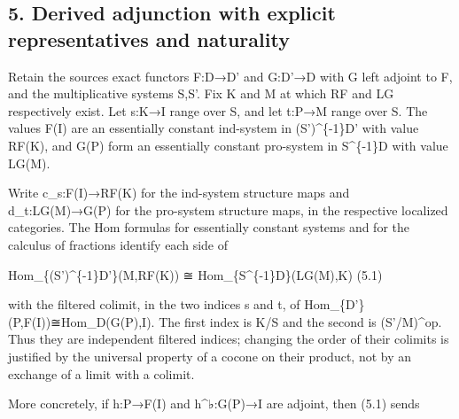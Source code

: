 \subsection{5. Derived adjunction with explicit representatives and naturality}\label{proofs-9206-9744-derived-adjunction-with-explicit-representatives-and-naturality}

Retain the source\textquotesingle s exact functors F:\allowbreak{}D\allowbreak{}→D' and G:\allowbreak{}D'\allowbreak{}→D with G left adjoint to F,\allowbreak{} and the multiplicative systems S,\allowbreak{}S'. Fix K and M at which RF and LG respectively exist. Let s:\allowbreak{}K\allowbreak{}→I range over S,\allowbreak{} and let t:\allowbreak{}P\allowbreak{}→M range over S\textquotesingle. The values F(I)\allowbreak{} are an essentially constant ind-system in (S')\allowbreak{}\textasciicircum{}\{-1\}D' with value RF(K)\allowbreak{},\allowbreak{} and G(P)\allowbreak{} form an essentially constant pro-system in S\^{}\{-1\}D with value LG(M)\allowbreak{}.

Write c\_\allowbreak{}s:\allowbreak{}F(I)\allowbreak{}\allowbreak{}→RF(K)\allowbreak{} for the ind-system structure maps and d\_\allowbreak{}t:\allowbreak{}LG(M)\allowbreak{}\allowbreak{}→G(P)\allowbreak{} for the pro-system structure maps,\allowbreak{} in the respective localized categories. The Hom formulas for essentially constant systems and for the calculus of fractions identify each side of

Hom\_\allowbreak{}\{(S')\allowbreak{}\textasciicircum{}\{-1\}D'\}(M,\allowbreak{}RF(K)\allowbreak{})\allowbreak{} ≅ Hom\_\allowbreak{}\{S\textasciicircum{}\{-1\}D\}(LG(M)\allowbreak{},\allowbreak{}K)\allowbreak{} (5.1)\allowbreak{}

with the filtered colimit,\allowbreak{} in the two indices s and t,\allowbreak{} of Hom\_\allowbreak{}\{D'\}(P,\allowbreak{}F(I)\allowbreak{})\allowbreak{}≅Hom\_\allowbreak{}D(G(P)\allowbreak{},\allowbreak{}I)\allowbreak{}. The first index is K/\allowbreak{}S and the second is (S'/\allowbreak{}M)\allowbreak{}\textasciicircum{}op. Thus they are independent filtered indices; changing the order of their colimits is justified by the universal property of a cocone on their product,\allowbreak{} not by an exchange of a limit with a colimit.

More concretely,\allowbreak{} if h:\allowbreak{}P\allowbreak{}→F(I)\allowbreak{} and h\textasciicircum{}{\Rsixtyonesymbolfont ♭}:\allowbreak{}G(P)\allowbreak{}\allowbreak{}→I are adjoint,\allowbreak{} then (5.1)\allowbreak{} sends

